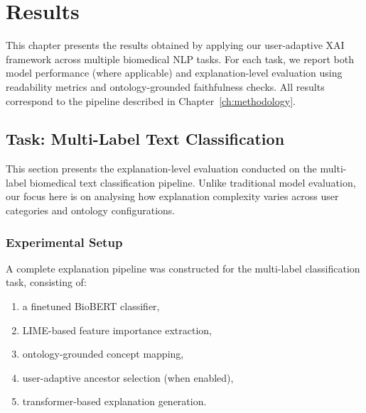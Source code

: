 \chapter{Results}\label{ch:results}

This chapter presents the results obtained by applying our user-adaptive XAI framework across multiple biomedical NLP tasks. For each task, we report both model performance (where applicable) and explanation-level evaluation using readability metrics and ontology-grounded faithfulness checks. All results correspond to the pipeline described in Chapter~\ref{ch:methodology}.

\section{Task: Multi-Label Text Classification}
\label{sec:multilabel_results}

This section presents the explanation-level evaluation conducted on the multi-label biomedical text classification pipeline. 
Unlike traditional model evaluation, our focus here is on analysing how explanation complexity varies across user categories and ontology configurations.



\subsection{Experimental Setup}
\label{subsec:experimental_setup}

A complete explanation pipeline was constructed for the multi-label classification task, consisting of:

\begin{enumerate}
    \item a finetuned BioBERT classifier,
    \item LIME-based feature importance extraction,
    \item ontology-grounded concept mapping,
    \item user-adaptive ancestor selection (when enabled),
    \item transformer-based explanation generation.
\end{enumerate}

